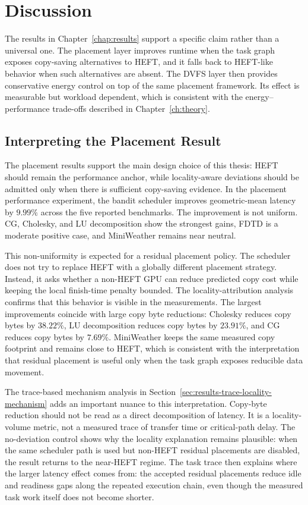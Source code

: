 \chapter{Discussion}
\label{chap:discussion}

The results in Chapter~\ref{chap:results} support a specific claim rather
than a universal one. The placement layer improves runtime when the \CUDASTF{}
task graph exposes copy-saving alternatives to HEFT, and it falls back to
HEFT-like behavior when such alternatives are absent. The DVFS layer then
provides conservative energy control on top of the same placement framework.
Its effect is measurable but workload dependent, which is consistent with the
energy--performance trade-offs described in Chapter~\ref{ch:theory}.

\section{Interpreting the Placement Result}
\label{sec:discussion-placement}

The placement results support the main design choice of this thesis: HEFT
should remain the performance anchor, while locality-aware deviations should be
admitted only when there is sufficient copy-saving evidence. In the placement
performance experiment, the bandit scheduler improves geometric-mean latency
by \(9.99\%\) across the five reported benchmarks. The improvement is not
uniform. CG, Cholesky, and LU decomposition show the strongest gains, FDTD is a
moderate positive case, and MiniWeather remains near neutral.

This non-uniformity is expected for a residual placement policy. The scheduler
does not try to replace HEFT with a globally different placement strategy.
Instead, it asks whether a non-HEFT GPU can reduce predicted copy cost while
keeping the local finish-time penalty bounded. The locality-attribution
analysis confirms that this behavior is visible in the measurements. The
largest improvements coincide with large copy byte reductions: Cholesky reduces
copy bytes by \(38.22\%\), LU decomposition reduces copy bytes by \(23.91\%\),
and CG reduces copy bytes by \(7.69\%\). MiniWeather keeps the same measured
copy footprint and remains close to HEFT, which is consistent with the
interpretation that residual placement is useful only when the task graph
exposes reducible data movement.

The trace-based mechanism analysis in
Section~\ref{sec:results-trace-locality-mechanism} adds an important nuance to
this interpretation. Copy-byte reduction should not be read as a direct
decomposition of latency. It is a locality-volume metric, not a measured trace
of transfer time or critical-path delay. The no-deviation control shows why the
locality explanation remains plausible: when the same scheduler path is used but
non-HEFT residual placements are disabled, the result returns to the near-HEFT
regime. The task trace then explains where the larger latency effect comes from:
the accepted residual placements reduce idle and readiness gaps along the
repeated execution chain, even though the measured task work itself does not
become shorter.


